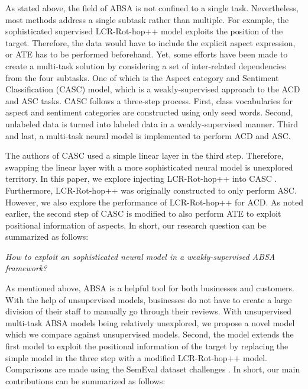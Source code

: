 \documentclass[american, oneside]{ecsgdp}
\begin{document}
As stated above, the field of ABSA is not confined to a single task. Nevertheless, most methods address a single subtask rather than multiple. For example, the sophisticated supervised LCR-Rot-hop++ \parencite{Trusca2020HAABSA++} model exploits the position of the target. Therefore, the data would have to include the explicit aspect expression, or ATE has to be performed beforehand. Yet, some efforts have been made to create a multi-task solution by considering a set of inter-related dependencies from the four subtasks. One of which is the Aspect category and Sentiment Classification (CASC) \parencite{Kumar2021CASC} model, which is a weakly-supervised approach to the ACD and ASC tasks. CASC follows a three-step process. First, class vocabularies for aspect and sentiment categories are constructed using only seed words. Second, unlabeled data is turned into labeled data in a weakly-supervised manner. Third and last, a multi-task neural model is implemented to perform ACD and ASC.

The authors of CASC used a simple linear layer in the third step. Therefore, swapping the linear layer with a more sophisticated neural model is unexplored territory. In this paper, we explore injecting LCR-Rot-hop++ \parencite{Trusca2020HAABSA++} into CASC \parencite{Kumar2021CASC}. Furthermore, LCR-Rot-hop++ was originally constructed to only perform ASC. However, we also explore the performance of LCR-Rot-hop++ for ACD. As noted earlier, the second step of CASC is modified to also perform ATE to exploit positional information of aspects. In short, our research question can be summarized as follows:

\begin{center}
    \textit{How to exploit an sophisticated neural model in a weakly-supervised ABSA framework?}
\end{center}

As mentioned above, ABSA is a helpful tool for both businesses and customers. With the help of unsupervised models, businesses do not have to create a large division of their staff to manually go through their reviews. With unsupervised multi-task ABSA models being relatively unexplored, we propose a novel model which we compare against unsupervised models. Second, the model extends the first model to exploit the positional information of the target by replacing the simple model in the three step with a modified LCR-Rot-hop++ model. Comparisons are made using the SemEval dataset challenges \parencite{Pontiki2015SemEval, Pontiki2016SemEval}. In short, our main contributions can be summarized as follows:
\end{document}
